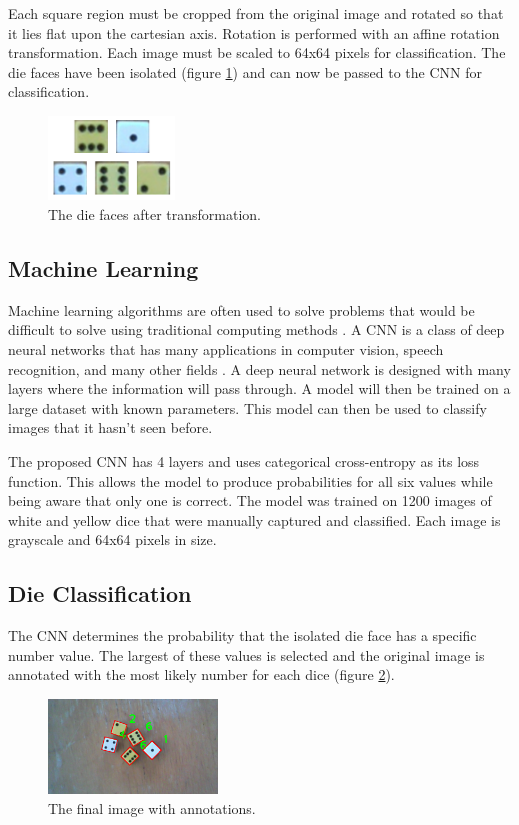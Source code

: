 \documentclass[conference]{IEEEtran}
\begin{document}
Each square region must be cropped from the original image and rotated so that it lies flat upon the cartesian axis.
Rotation is performed with an affine rotation transformation.
Each image must be scaled to 64x64 pixels for classification.
The die faces have been isolated (figure \ref{fig:faces}) and can now be passed to the CNN for classification.
\begin{figure}
	\centering
	\includegraphics[width=0.3\textwidth]{faces}
	\caption{The die faces after transformation.}
	\label{fig:faces}
\end{figure}

\subsection{Machine Learning}

Machine learning algorithms are often used to solve problems that would be difficult to solve using traditional computing methods \cite{Goodfellow2016}.
A CNN is a class of deep neural networks that has many applications in computer vision, speech recognition, and many other fields \cite{Pena2014}\cite{Madabhushi2016}\cite{Lawrence1997}\cite{Kalchbrenner2014}.
A deep neural network is designed with many layers where the information will pass through.
A model will then be trained on a large dataset with known parameters.
This model can then be used to classify images that it hasn't seen before.

The proposed CNN has 4 layers and uses categorical cross-entropy as its loss function. 
This allows the model to produce probabilities for all six values while being aware that only one is correct.
The model was trained on 1200 images of white and yellow dice that were manually captured and classified.
Each image is grayscale and 64x64 pixels in size.

\subsection{Die Classification}

The CNN determines the probability that the isolated die face has a specific number value.
The largest of these values is selected and the original image is annotated with the most likely number for each dice (figure \ref{fig:annotated}).
\begin{figure}
	\centering
	\includegraphics[width=0.4\textwidth]{annotated}
	\caption{The final image with annotations.}
	\label{fig:annotated}
\end{figure}
\end{document}
